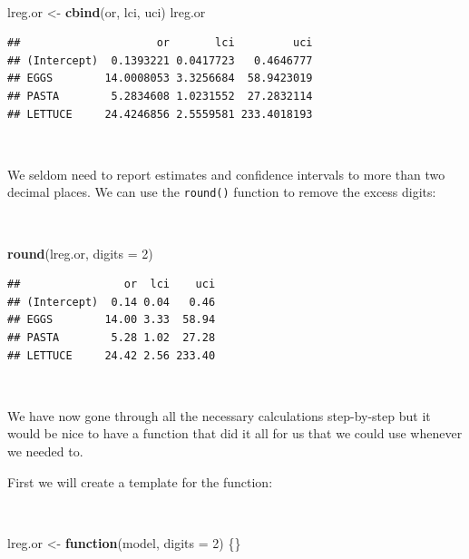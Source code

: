 \documentclass[12pt,a4paper]{book}
\newenvironment{Shaded}{\begin{snugshade}}{\end{snugshade}}
\newcommand{\KeywordTok}[1]{\textcolor[rgb]{0.13,0.29,0.53}{\textbf{#1}}}
\newcommand{\DataTypeTok}[1]{\textcolor[rgb]{0.13,0.29,0.53}{#1}}
\newcommand{\DecValTok}[1]{\textcolor[rgb]{0.00,0.00,0.81}{#1}}
\newcommand{\StringTok}[1]{\textcolor[rgb]{0.31,0.60,0.02}{#1}}
\newcommand{\ControlFlowTok}[1]{\textcolor[rgb]{0.13,0.29,0.53}{\textbf{#1}}}
\newcommand{\NormalTok}[1]{#1}
\theoremstyle{definition}
\theoremstyle{definition}
\theoremstyle{definition}
\theoremstyle{remark}
\begin{document}
~

\begin{Shaded}
\begin{Highlighting}[]
\NormalTok{lreg.or <-}\StringTok{ }\KeywordTok{cbind}\NormalTok{(or, lci, uci)}
\NormalTok{lreg.or}
\end{Highlighting}
\end{Shaded}

\begin{verbatim}
##                     or       lci         uci
## (Intercept)  0.1393221 0.0417723   0.4646777
## EGGS        14.0008053 3.3256684  58.9423019
## PASTA        5.2834608 1.0231552  27.2832114
## LETTUCE     24.4246856 2.5559581 233.4018193
\end{verbatim}

~

We seldom need to report estimates and confidence intervals to more than
two decimal places. We can use the \texttt{round()} function to remove
the excess digits:

~

\begin{Shaded}
\begin{Highlighting}[]
\KeywordTok{round}\NormalTok{(lreg.or, }\DataTypeTok{digits =} \DecValTok{2}\NormalTok{)}
\end{Highlighting}
\end{Shaded}

\begin{verbatim}
##                or  lci    uci
## (Intercept)  0.14 0.04   0.46
## EGGS        14.00 3.33  58.94
## PASTA        5.28 1.02  27.28
## LETTUCE     24.42 2.56 233.40
\end{verbatim}

~

We have now gone through all the necessary calculations step-by-step but
it would be nice to have a function that did it all for us that we could
use whenever we needed to.

First we will create a template for the function:

~

\begin{Shaded}
\begin{Highlighting}[]
\NormalTok{lreg.or <-}\StringTok{ }\ControlFlowTok{function}\NormalTok{(model, }\DataTypeTok{digits =} \DecValTok{2}\NormalTok{) \{\}}
\end{Highlighting}
\end{Shaded}

~
\end{document}
